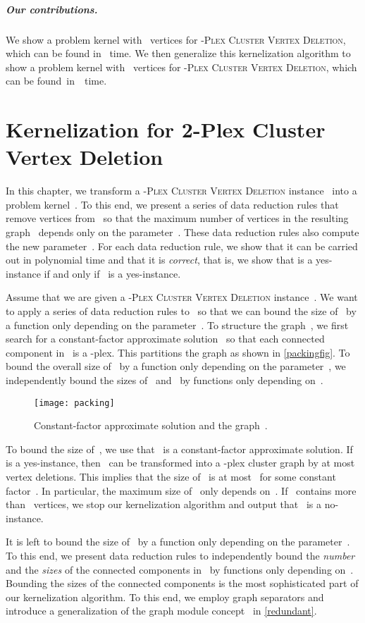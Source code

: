 \documentclass[12pt, a4paper, abstracton]{scrreprt}
\renewcommand{\cite}{~\citep}
\newcommand{\name}{\textsc}
\newcommand{\pvd}[1]{\name{\mbox{-Plex} Cluster Vertex Deletion}}
\newcommand{\pl}[1]{\mbox{-plex}}
\newcommand{\pcg}[1]{\pl #1 cluster graph}
\theoremstyle{definition}
\theoremstyle{remark}
\begin{document}
\paragraph{Our contributions.}
We show a problem kernel with ~vertices for \pvd2, which can be found in ~time. We then generalize this kernelization algorithm to show a problem kernel with ~vertices for \pvd s, which can be found~in~~time.

\chapter{Kernelization for 2-Plex Cluster Vertex Deletion}
\label{2pvd}
In this chapter, we transform a \pvd2 instance~ into a problem kernel~. To this end, we present a series of data reduction rules that remove vertices from~ so that the maximum number of vertices in the resulting graph~ depends only on the parameter~. These data reduction rules also compute the new parameter~. For each data reduction rule, we show that it can be carried out in polynomial time and that it is \emph{correct}, that is, we show that  is a yes-instance if and only if~ is a yes-instance.


Assume that we are given a \pvd2 instance~. We want to apply a series of data reduction rules to~ so that we can bound the size of~ by a function only depending on the parameter~. To structure the graph~, we first search for a constant-factor approximate solution~ so that each connected component in~ is a \pl2. This partitions the graph as shown in \autoref{packingfig}. To bound the overall size of~ by a function only depending on the parameter~, we independently bound the sizes of~ and~ by functions only depending on~.

\begin{figure}[h]
  \centering
  \texttt{[image: packing]}
  \caption{Constant-factor approximate solution  and the graph~.}
  \label{packingfig}
\end{figure}

\noindent To bound the size of~, we use that~ is a constant-factor approximate solution. If~ is a yes-instance, then~ can be transformed into a \pcg 2 by at most~ vertex deletions. This implies that the size of~ is at most~ for some constant factor~. In particular, the maximum size of~ only depends on~. If~ contains more than~ vertices, we stop our kernelization algorithm and output that~ is a no-instance.

It is left to bound the size of~ by a function only depending on the parameter~. To this end, we present data reduction rules to independently bound the \emph{number} and the \emph{sizes} of the connected components in~ by functions only depending on~. Bounding the sizes of the connected components is the most sophisticated part of our kernelization algorithm. To this end, we employ graph separators and introduce a generalization of the graph module concept\cite{Gal67,DBLP:journals/dm/McConnellS99} in \autoref{redundant}.
\end{document}
